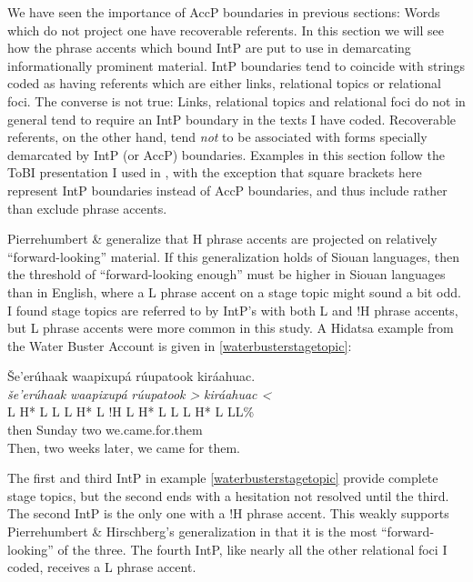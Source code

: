 \documentclass[output=paper]{LSP/langsci}
\begin{document}
	We have seen the importance of AccP boundaries in previous sections: Words which do not project one have recoverable referents. In this section we will see how the phrase accents which bound IntP are put to use in demarcating informationally prominent material. IntP boundaries tend to coincide with strings coded as having referents which are either links, relational topics or relational foci. The converse is not true: Links, relational topics and relational foci do not in general tend to require an IntP boundary in the texts I have coded. Recoverable referents, on the other hand, tend \emph{not} to be associated with forms specially demarcated by IntP (or AccP) boundaries. Examples in this section follow the ToBI presentation I used in , with the exception that square brackets here represent IntP boundaries instead of AccP boundaries, and thus include rather than exclude phrase accents.
	
	Pierrehumbert \& \citet{Hirschberg1990} generalize that H phrase accents are projected on relatively “forward-looking” material. If this generalization holds of Siouan languages, then the threshold of “forward-looking enough” must be higher in Siouan languages than in English, where a L phrase accent on a stage topic might sound a bit odd. I found stage topics are referred to by IntP’s with both L and !H phrase accents, but L phrase accents were more common in this study. A Hidatsa example from the Water Buster Account is given in \ref{waterbusterstagetopic}:
	
\ea\label{waterbusterstagetopic}
Še’erúhaak waapixupá rúupatook kiráahuac.\footnotemark\\
\glll	\emph{še’erúhaak}		\emph{waapixupá}		\emph{rúupatook >	}	\emph{kiráahuac <}\\
	{\ob L H* L L\cb}		{\ob L H* L !H\cb}		{\ob L H* L L\cb}		{\ob L H* L L\cb{}L\%}\\
	then				Sunday			two				we.came.for.them\\
\glt	Then, two weeks later, we came for them.
\z

The first and third IntP in example \ref{waterbusterstagetopic} provide complete stage topics, but the second ends with a hesitation not resolved until the third. The second IntP is the only one with a !H phrase accent. This weakly supports Pierrehumbert \& Hirschberg’s generalization in that it is the most “forward-looking” of the three. The fourth IntP, like nearly all the other relational foci I coded, receives a L phrase accent.
\end{document}
